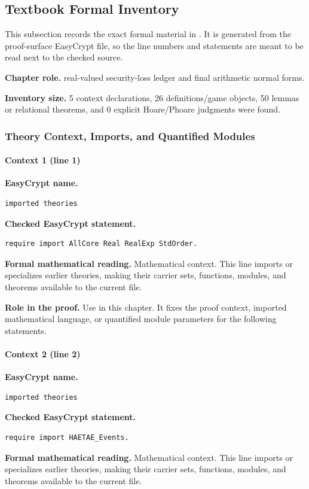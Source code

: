\subsection*{Textbook Formal Inventory}
This subsection records the exact formal material in .  It is generated from the proof-surface EasyCrypt file, so the line numbers and statements are meant to be read next to the checked source.

\noindent\textbf{Chapter role.} real-valued security-loss ledger and final arithmetic normal forms.

\noindent\textbf{Inventory size.} 5 context declarations, 26 definitions/game objects, 50 lemmas or relational theorems, and 0 explicit Hoare/Phoare judgments were found.

\subsubsection*{Theory Context, Imports, and Quantified Modules}
\paragraph{Context 1 (line 1)}
\noindent\textbf{EasyCrypt name.}
\begin{lstlisting}[language=EasyCrypt,basicstyle=\ttfamily\scriptsize]
imported theories
\end{lstlisting}
\noindent\textbf{Checked EasyCrypt statement.}
\begin{lstlisting}[language=EasyCrypt,basicstyle=\ttfamily\scriptsize]
require import AllCore Real RealExp StdOrder.
\end{lstlisting}
\noindent\textbf{Formal mathematical reading.}
Mathematical context. This line imports or specializes earlier theories, making their carrier sets, functions, modules, and theorems available to the current file.

\noindent\textbf{Role in the proof.}
Use in this chapter. It fixes the proof context, imported mathematical language, or quantified module parameters for the following statements.

\paragraph{Context 2 (line 2)}
\noindent\textbf{EasyCrypt name.}
\begin{lstlisting}[language=EasyCrypt,basicstyle=\ttfamily\scriptsize]
imported theories
\end{lstlisting}
\noindent\textbf{Checked EasyCrypt statement.}
\begin{lstlisting}[language=EasyCrypt,basicstyle=\ttfamily\scriptsize]
require import HAETAE_Events.
\end{lstlisting}
\noindent\textbf{Formal mathematical reading.}
Mathematical context. This line imports or specializes earlier theories, making their carrier sets, functions, modules, and theorems available to the current file.

